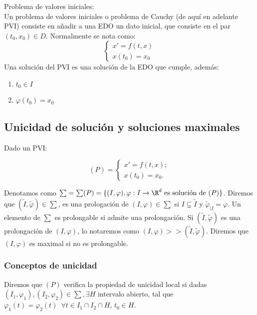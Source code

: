 \documentclass{article}
\begin{document}
\begin{definition} Problema de valores iniciales:\\
    Un problema de valores iniciales o problema de Cauchy (de aquí en adelante PVI)
    consiste en añadir a una EDO un dato inicial, que consiste en el par $(t_0, x_0) \in D$.
    Normalmente se nota como:
    \[
    \left\{
    \begin{array}{l}
        x' = f(t,x) \\
        x(t_0) = x_0
    \end{array}
    \right.
    \]
    Una solución del PVI es una solución de la EDO que cumple, además:
    \begin{enumerate}
        \item $t_0 \in I$
        \item $\varphi(t_0) = x_0$
    \end{enumerate}
\end{definition}

\subsection{Unicidad de solución y soluciones maximales}

Dado un PVI:

\[
  (P) = \left\{
    \begin{array}{l}
      x' = f(t,x); \\
      x(t_0) = x_0.
    \end{array}
  \right.
\]


Denotamos como $\sum = \sum(P) = \{(I, \varphi), \varphi: I \to \R^d \text{ es solución
de } (P)\}$. Diremos que $(\tilde{I}, \tilde{\varphi}) \in \sum$, es una prologación
de $(I, \varphi) \in \sum$ si $I \subsetneq \tilde{I}$ y $\tilde{\varphi}_{|I} = \varphi$.
Un elemento de $\sum$ es prolongable si admite una prolongación. Si $(\tilde{I},
\tilde{\varphi})$ es una prolongación de $(I, \varphi)$, lo notaremos como $(I, \varphi)
>> (\tilde{I}, \tilde{\varphi})$. Diremos que $(I, \varphi)$ es maximal si no es
prolongable.

\subsubsection{Conceptos de unicidad}

Diremos que $(P)$ verifica la propiedad de unicidad local si dadas
$(I_1, \varphi_1), (I_2, \varphi_2) \in \sum, \exists H$ intervalo abierto, tal que $\varphi_1(t) =
\varphi_2(t)\,\,\, \forall t \in I_1 \cap I_2 \cap H$, $t_0 \in H$.
\end{document}
